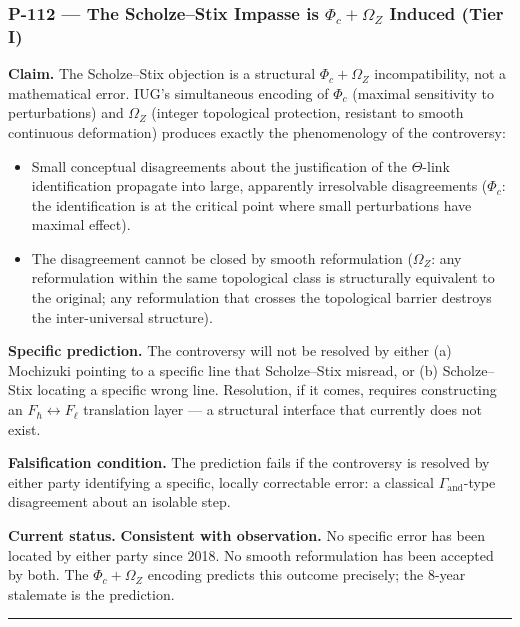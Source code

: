 \documentclass[10pt,a4paper]{article}
\begin{document}
\subsubsection{P-112 --- The Scholze--Stix Impasse is $\Phi_c + \Omega_Z$ Induced (Tier I)}

\textbf{Claim.} The Scholze--Stix objection is a structural $\Phi_c + \Omega_Z$ incompatibility,
not a mathematical error. IUG's simultaneous encoding of $\Phi_c$ (maximal sensitivity to
perturbations) and $\Omega_Z$ (integer topological protection, resistant to smooth
continuous deformation) produces exactly the phenomenology of the controversy:

\begin{itemize}
    \item Small conceptual disagreements about the justification of the $\Theta$-link identification
propagate into large, apparently irresolvable disagreements ($\Phi_c$: the identification
is at the critical point where small perturbations have maximal effect).
    \item The disagreement cannot be closed by smooth reformulation ($\Omega_Z$: any reformulation
within the same topological class is structurally equivalent to the original; any
reformulation that crosses the topological barrier destroys the inter-universal structure).
\end{itemize}

\textbf{Specific prediction.} The controversy will not be resolved by either (a) Mochizuki
pointing to a specific line that Scholze--Stix misread, or (b) Scholze--Stix locating a
specific wrong line. Resolution, if it comes, requires constructing an $F_{\hbar}
\leftrightarrow F_{\ell}$ translation layer --- a structural interface that currently does not
exist.

\textbf{Falsification condition.} The prediction fails if the controversy is resolved by either
party identifying a specific, locally correctable error: a classical $\Gamma_\text{and}$-type
disagreement about an isolable step.

\textbf{Current status.} \textbf{Consistent with observation.} No specific error has been located by
either party since 2018. No smooth reformulation has been accepted by both. The $\Phi_c +
\Omega_Z$ encoding predicts this outcome precisely; the 8-year stalemate is the prediction.

\begin{center}
\rule{0.5\textwidth}{0.4pt}
\end{center}
\end{document}
